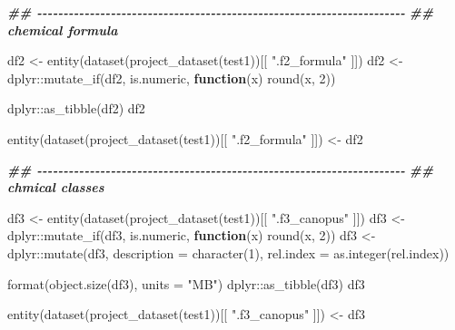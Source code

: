 \documentclass[
]{article}
\newenvironment{Shaded}{\begin{snugshade}}{\end{snugshade}}
\newcommand{\AttributeTok}[1]{\textcolor[rgb]{0.77,0.63,0.00}{#1}}
\newcommand{\ControlFlowTok}[1]{\textcolor[rgb]{0.13,0.29,0.53}{\textbf{#1}}}
\newcommand{\DecValTok}[1]{\textcolor[rgb]{0.00,0.00,0.81}{#1}}
\newcommand{\DocumentationTok}[1]{\textcolor[rgb]{0.56,0.35,0.01}{\textbf{\textit{#1}}}}
\newcommand{\FunctionTok}[1]{\textcolor[rgb]{0.00,0.00,0.00}{#1}}
\newcommand{\NormalTok}[1]{#1}
\newcommand{\OtherTok}[1]{\textcolor[rgb]{0.56,0.35,0.01}{#1}}
\newcommand{\SpecialCharTok}[1]{\textcolor[rgb]{0.00,0.00,0.00}{#1}}
\newcommand{\StringTok}[1]{\textcolor[rgb]{0.31,0.60,0.02}{#1}}
\begin{document}
\begin{Shaded}
\begin{Highlighting}[]
\DocumentationTok{\#\# {-}{-}{-}{-}{-}{-}{-}{-}{-}{-}{-}{-}{-}{-}{-}{-}{-}{-}{-}{-}{-}{-}{-}{-}{-}{-}{-}{-}{-}{-}{-}{-}{-}{-}{-}{-}{-}{-}{-}{-}{-}{-}{-}{-}{-}{-}{-}{-}{-}{-}{-}{-}{-}{-}{-}{-}{-}{-}{-}{-}{-}{-}{-}{-}{-}{-}{-}{-}{-}{-} }
\DocumentationTok{\#\# chemical formula}

\NormalTok{df2 }\OtherTok{\textless{}{-}} \FunctionTok{entity}\NormalTok{(}\FunctionTok{dataset}\NormalTok{(}\FunctionTok{project\_dataset}\NormalTok{(test1))[[ }\StringTok{".f2\_formula"}\NormalTok{ ]])}
\NormalTok{df2 }\OtherTok{\textless{}{-}}\NormalTok{ dplyr}\SpecialCharTok{::}\FunctionTok{mutate\_if}\NormalTok{(df2, is.numeric, }\ControlFlowTok{function}\NormalTok{(x) }\FunctionTok{round}\NormalTok{(x, }\DecValTok{2}\NormalTok{))}

\NormalTok{dplyr}\SpecialCharTok{::}\FunctionTok{as\_tibble}\NormalTok{(df2)}
\NormalTok{df2}

\FunctionTok{entity}\NormalTok{(}\FunctionTok{dataset}\NormalTok{(}\FunctionTok{project\_dataset}\NormalTok{(test1))[[ }\StringTok{".f2\_formula"}\NormalTok{ ]]) }\OtherTok{\textless{}{-}}\NormalTok{ df2}

\DocumentationTok{\#\# {-}{-}{-}{-}{-}{-}{-}{-}{-}{-}{-}{-}{-}{-}{-}{-}{-}{-}{-}{-}{-}{-}{-}{-}{-}{-}{-}{-}{-}{-}{-}{-}{-}{-}{-}{-}{-}{-}{-}{-}{-}{-}{-}{-}{-}{-}{-}{-}{-}{-}{-}{-}{-}{-}{-}{-}{-}{-}{-}{-}{-}{-}{-}{-}{-}{-}{-}{-}{-}{-} }
\DocumentationTok{\#\# chmical classes}

\NormalTok{df3 }\OtherTok{\textless{}{-}} \FunctionTok{entity}\NormalTok{(}\FunctionTok{dataset}\NormalTok{(}\FunctionTok{project\_dataset}\NormalTok{(test1))[[ }\StringTok{".f3\_canopus"}\NormalTok{ ]])}
\NormalTok{df3 }\OtherTok{\textless{}{-}}\NormalTok{ dplyr}\SpecialCharTok{::}\FunctionTok{mutate\_if}\NormalTok{(df3, is.numeric, }\ControlFlowTok{function}\NormalTok{(x) }\FunctionTok{round}\NormalTok{(x, }\DecValTok{2}\NormalTok{))}
\NormalTok{df3 }\OtherTok{\textless{}{-}}\NormalTok{ dplyr}\SpecialCharTok{::}\FunctionTok{mutate}\NormalTok{(df3, }\AttributeTok{description =} \FunctionTok{character}\NormalTok{(}\DecValTok{1}\NormalTok{),}
                     \AttributeTok{rel.index =} \FunctionTok{as.integer}\NormalTok{(rel.index))}

\FunctionTok{format}\NormalTok{(}\FunctionTok{object.size}\NormalTok{(df3), }\AttributeTok{units =} \StringTok{"MB"}\NormalTok{)}
\NormalTok{dplyr}\SpecialCharTok{::}\FunctionTok{as\_tibble}\NormalTok{(df3)}
\NormalTok{df3}

\FunctionTok{entity}\NormalTok{(}\FunctionTok{dataset}\NormalTok{(}\FunctionTok{project\_dataset}\NormalTok{(test1))[[ }\StringTok{".f3\_canopus"}\NormalTok{ ]]) }\OtherTok{\textless{}{-}}\NormalTok{ df3}


\end{Highlighting}
\end{Shaded}
\end{document}
